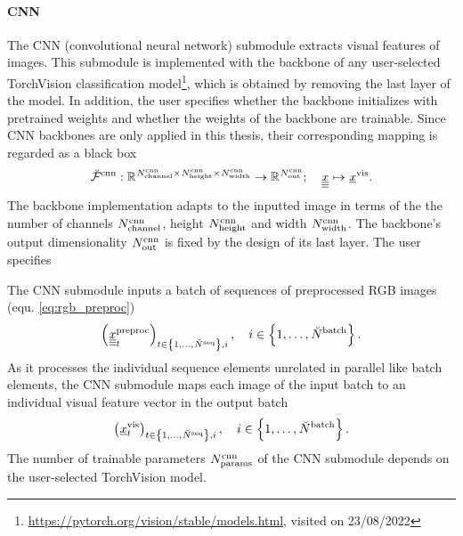 \paragraph*{CNN} ${}$\\
The CNN (convolutional neural network) submodule 
extracts visual features of images.
This submodule is implemented with the backbone
of any user-selected TorchVision
classification model\footnote{
    \url{https://pytorch.org/vision/stable/models.html}, visited on 23/08/2022
},
which is obtained by removing the last layer of the model.
In addition, the user specifies whether the backbone
initializes with pretrained weights and whether
the weights of the backbone are trainable.
Since CNN backbones are only applied in this thesis, 
their corresponding mapping is 
regarded as a black box 
\begin{align} \label{eq:CNN}
    \CNNMap 
    :
    \setOfAllRealNumbers^{\CNNNumC \times \CNNHeight \times \CNNWidth} 
    \rightarrow 
    \setOfAllRealNumbers^{\CNNOutp}
    ;\quad 
    \img[]{}{}{}{}
    \mapsto 
    \visFeatVec{}
    .
\end{align}
The backbone implementation adapts to the inputted image
in terms of the 
the number of channels $\CNNNumC$,
height $\CNNHeight$
and width $\CNNWidth$.
The backbone's output dimensionality 
$\CNNOutp$
is fixed by the design of its last layer.
The user specifies

The CNN submodule inputs
a batch of sequences of preprocessed RGB images 
(equ. \ref{eq:rgb_preproc}) 
\begin{equation}
    \series{\preprocRGB{t}}_{t \in \setOfInts{1, \dots, \seqLen}, i}
    ,\quad 
    i \in \setOfInts{1, \dots, \batchSize}.
\end{equation}
As it processes the individual sequence elements 
unrelated in parallel like batch elements,
the CNN submodule maps each image of the input batch 
to an individual visual feature vector in the output batch
\begin{equation} \label{eq:cnn_output}
    \series{\visFeatVec{t}}_{t \in \setOfInts{1, \dots, \seqLen}, i}
    ,\quad 
    i \in \setOfInts{1, \dots, \batchSize}.
\end{equation}
The number of trainable parameters $\CNNNumP$ of the CNN submodule 
depends on the user-selected TorchVision model.





